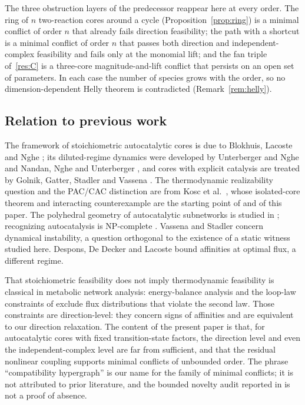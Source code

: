 \documentclass[11pt,a4paper]{article}
\theoremstyle{plain}
\theoremstyle{definition}
\theoremstyle{remark}
\begin{document}
The three obstruction layers of the predecessor reappear here at every order. The ring of $n$ two-reaction cores around a cycle (Proposition~\ref{prop:ring}) is a minimal conflict of order $n$ that already fails direction feasibility; the path with a shortcut is a minimal conflict of order $n$ that passes both direction and independent-complex feasibility and fails only at the monomial lift; and the fan triple of~\ref{res:C} is a three-core magnitude-and-lift conflict that persists on an open set of parameters. In each case the number of species grows with the order, so no dimension-dependent Helly theorem is contradicted (Remark~\ref{rem:helly}).

\subsection{Relation to previous work}

The framework of stoichiometric autocatalytic cores is due to Blokhuis, Lacoste and Nghe \citep{blokhuis2020}; its diluted-regime dynamics were developed by Unterberger and Nghe \citep{unterberger2022} and Nandan, Nghe and Unterberger \citep{nandan2025}, and cores with explicit catalysis are treated by Golnik, Gatter, Stadler and Vassena \citep{golnik2026cores}. The thermodynamic realizability question and the PAC/CAC distinction are from Kosc et al.\ \citep{kosc2025}, whose isolated-core theorem and interacting counterexample are the starting point of \citep{tcic2026} and of this paper. The polyhedral geometry of autocatalytic subnetworks is studied in \citep{gagrani2024}; recognizing autocatalysis is NP-complete \citep{andersen2012,kosc2025}. Vassena and Stadler \citep{vassena2024} concern dynamical instability, a question orthogonal to the existence of a static witness studied here. Despons, De Decker and Lacoste \citep{despons2024} bound affinities at optimal flux, a different regime.

That stoichiometric feasibility does not imply thermodynamic feasibility is classical in metabolic network analysis: energy-balance analysis \citep{beard2002} and the loop-law constraints of \citep{beard2004} exclude flux distributions that violate the second law. Those constraints are direction-level: they concern signs of affinities and are equivalent to our direction relaxation. The content of the present paper is that, for autocatalytic cores with fixed transition-state factors, the direction level and even the independent-complex level are far from sufficient, and that the residual nonlinear coupling supports minimal conflicts of unbounded order. The phrase ``compatibility hypergraph'' is our name for the family of minimal conflicts; it is not attributed to prior literature, and the bounded novelty audit reported in \citep{tcic2026} is not a proof of absence.
\end{document}
